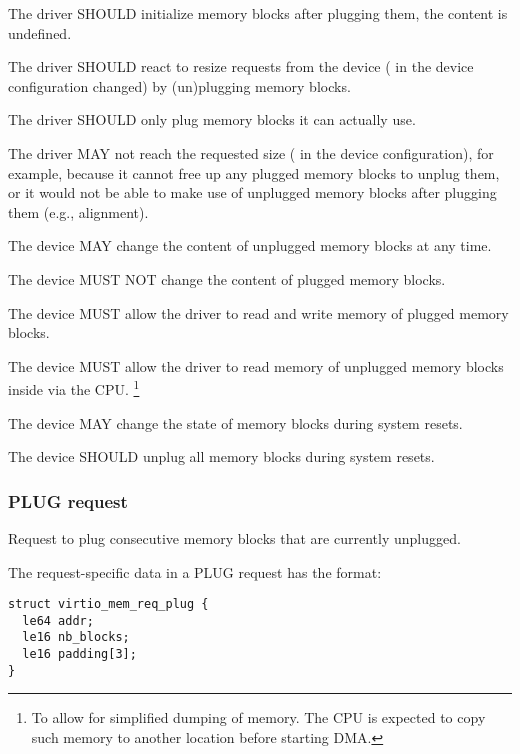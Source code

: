 The driver SHOULD initialize memory blocks after plugging them, the content
is undefined.

The driver SHOULD react to resize requests from the device
( in the device configuration changed) by
(un)plugging memory blocks.

The driver SHOULD only plug memory blocks it can actually use.

The driver MAY not reach the requested size ( in the
device configuration), for example, because it cannot free up any plugged
memory blocks to unplug them, or it would not be able to make use of
unplugged memory blocks after plugging them (e.g., alignment).


The device MAY change the content of unplugged memory blocks at any time.

The device MUST NOT change the content of plugged memory blocks.

The device MUST allow the driver to read and write memory of plugged
memory blocks.

The device MUST allow the driver to read memory of unplugged memory blocks
inside  via the CPU. \footnote{To allow for simplified
dumping of memory. The CPU is expected to copy such memory to another location
before starting DMA.}

The device MAY change the state of memory blocks during system resets.

The device SHOULD unplug all memory blocks during system resets.

\subsubsection{PLUG request}\label{sec:Device Types / Memory Device / Device Operation / PLUG request}

Request to plug consecutive memory blocks that are currently unplugged.

The request-specific data in a PLUG request has the format:

\begin{lstlisting}
struct virtio_mem_req_plug {
  le64 addr;
  le16 nb_blocks;
  le16 padding[3];
}
\end{lstlisting}

